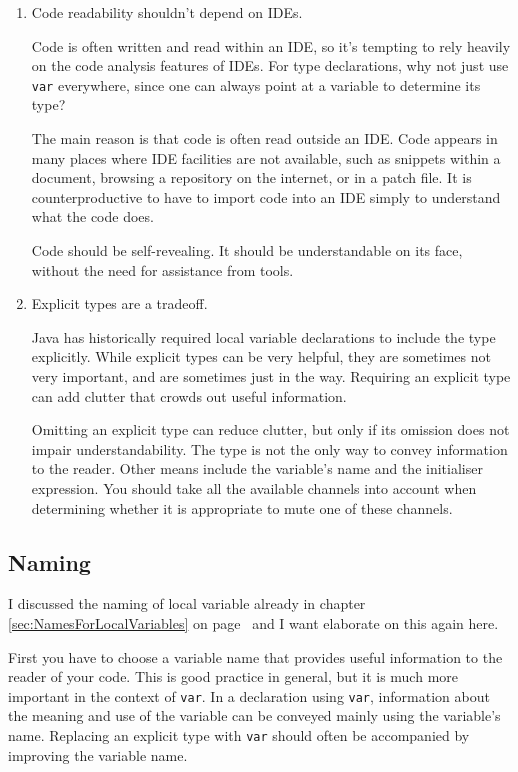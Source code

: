 \documentclass[11pt,a4paper, titlepage, parskip=half, headsepline, footsepline, cleardoublepage=current, headheight=1cm]{scrbook}
\newcommand*{\tqvref}[1]{\hyperref[{#1}]{\ref*{#1}} on page~\pageref{#1}}
\begin{document}
\begin{enumerate}[label=P\arabic*.]
\item{Code readability shouldn’t depend on IDEs.

Code is often written and read within an IDE, so it’s tempting to rely heavily on the code analysis features of IDEs. For type declarations, why not just use \lstinline|var| everywhere, since one can always point at a variable to determine its type?

The main reason is that code is often read outside an IDE. Code appears in many places where IDE facilities are not available, such as snippets within a document, browsing a repository on the internet, or in a patch file. It is counterproductive to have to import code into an IDE simply to understand what the code does.

Code should be self-revealing. It should be understandable on its face, without the need for assistance from tools.}

\item{Explicit types are a tradeoff.

Java has historically required local variable declarations to include the type explicitly. While explicit types can be very helpful, they are sometimes not very important, and are sometimes just in the way. Requiring an explicit type can add clutter that crowds out useful information.

Omitting an explicit type can reduce clutter, but only if its omission does not impair understandability. The type is not the only way to convey information to the reader. Other means include the variable's name and the initialiser expression. You should take all the available channels into account when determining whether it is appropriate to mute one of these channels.}
\end{enumerate}


\subsection{Naming}
I discussed the naming of local variable already in chapter \tqvref{sec:NamesForLocalVariables} and I want elaborate on this again here.

First you have to choose a variable name that provides useful information to the reader of your code. This is good practice in general, but it is much more important in the context of \lstinline|var|. In a declaration using \lstinline|var|, information about the meaning and use of the variable can be conveyed mainly using the variable's name. Replacing an explicit type with \lstinline|var| should often be accompanied by improving the variable name.
\end{document}
